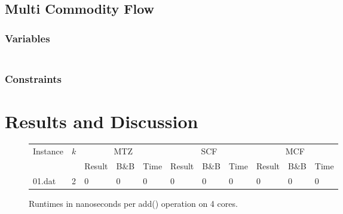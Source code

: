\documentclass{article}
\begin{document}
\subsection{Multi Commodity Flow}
\subsubsection{Variables}
\begin{eqnarray}
\end{eqnarray}
\subsubsection{Constraints}

\section{Results and Discussion}


\begin{figure}[H]
\centering
\begin{tabular}{lllllllllll}
\toprule
Instance & $k$ & \multicolumn{3}{c}{MTZ} & \multicolumn{3}{c}{SCF} & \multicolumn{3}{c}{MCF} \\
& & Result & B\&B & Time &
    Result & B\&B & Time &
    Result & B\&B & Time \\
\midrule
01.dat & 2 & 0 & 0 & 0 & 0 & 0 & 0 & 0 & 0 & 0 \\
\bottomrule
\end{tabular}
\caption{Runtimes in nanoseconds per add() operation on 4 cores.} %
\label{fig:go}
\end{figure}

\begin{comment}
Create a short document (preferably in LaTeX) of about 3
pages containing:
* Problem description
* SCF, MCF, and MTZ formulations, and descriptions of used
variables and constraints
* Result table comparing all 3 formulations, including
objective function values, running times, numbers of branch-and-bound nodes
* Short interpretation of results

TODO: MCF formulations
TODO: Bench results
TODO: Discussion
\end{comment}
\end{document}
